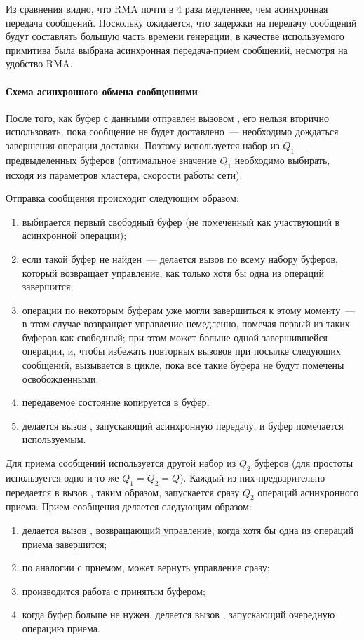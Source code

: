 Из сравнения видно, что RMA почти в 4 раза медленнее, чем асинхронная передача
сообщений. Поскольку ожидается, что задержки на передачу сообщений будут составлять
большую часть времени генерации, в качестве используемого примитива была выбрана
асинхронная передача-прием сообщений, несмотря на удобство RMA.

\paragraph{Схема асинхронного обмена сообщениями}
\label{sec:async-mpi-queue}

После того, как буфер с данными отправлен вызовом , его нельзя вторично
использовать, пока сообщение не будет доставлено~--- необходимо дождаться завершения
операции доставки. Поэтому используется набор из $Q_1$ предвыделенных буферов (оптимальное
значение $Q_1$ необходимо выбирать, исходя из параметров кластера, скорости работы
сети\etc).

Отправка сообщения происходит следующим образом:
\begin{enumerate}
\item выбирается первый свободный буфер (не помеченный как участвующий в асинхронной
  операции);
\item если такой буфер не найден~--- делается вызов  по всему набору
  буферов, который возвращает управление, как только хотя бы одна из операций завершится;
\item операции по некоторым буферам уже могли завершиться к этому моменту~--- в этом
  случае  возвращает управление немедленно, помечая первый из таких буферов
  как свободный; при этом может больше одной завершившейся операции, и, чтобы избежать
  повторных вызовов  при посылке следующих сообщений, 
  вызывается в цикле, пока все такие буфера не будут помечены освобожденными;
\item передавемое состояние копируется в буфер;
\item делается вызов , запускающий асинхронную передачу, и буфер помечается
  используемым.
\end{enumerate}

Для приема сообщений используется другой набор из $Q_2$ буферов (для простоты используется
одно и то же $Q_1 = Q_2 = Q$). Каждый из них предварительно передается в вызов
, таким образом, запускается сразу $Q_2$ операций асинхронного приема. Прием
сообщения делается следующим образом:
\begin{enumerate}
\item делается вызов , возвращающий управление, когда хотя бы одна из
  операций приема завершится;
\item по аналогии с приемом,  может вернуть управление сразу;
\item производится работа с принятым буфером;
\item когда буфер больше не нужен, делается вызов , запускающий очередную
  операцию приема.
\end{enumerate}

